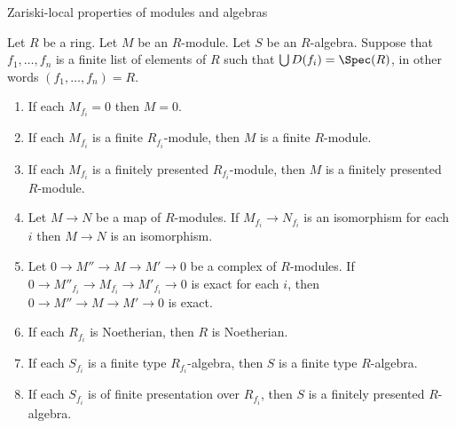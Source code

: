 \begin{lemma}
\label{lemma-cover}
\begin{slogan}
Zariski-local properties of modules and algebras
\end{slogan}
Let $R$ be a ring. Let $M$ be an $R$-module. Let $S$ be an $R$-algebra.
Suppose that $f_1, \ldots, f_n$ is a finite list of
elements of $R$ such that $\bigcup D(f_i) = \Spec(R)$,
in other words $(f_1, \ldots, f_n) = R$.
\begin{enumerate}
\item If each $M_{f_i} = 0$ then $M = 0$.
\item If each $M_{f_i}$ is a finite $R_{f_i}$-module,
then $M$ is a finite $R$-module.
\item If each $M_{f_i}$ is a finitely presented $R_{f_i}$-module,
then $M$ is a finitely presented $R$-module.
\item Let $M \to N$ be a map of $R$-modules. If $M_{f_i} \to N_{f_i}$
is an isomorphism for each $i$ then $M \to N$ is an isomorphism.
\item Let $0 \to M'' \to M \to M' \to 0$ be a complex of $R$-modules.
If $0 \to M''_{f_i} \to M_{f_i} \to M'_{f_i} \to 0$ is exact for each $i$,
then $0 \to M'' \to M \to M' \to 0$ is exact.
\item If each $R_{f_i}$ is Noetherian, then $R$ is Noetherian.
\item If each $S_{f_i}$ is a finite type $R_{f_i}$-algebra, then
$S$ is a finite type $R$-algebra.
\item If each $S_{f_i}$ is of finite presentation over $R_{f_i}$, then
$S$ is a finitely presented $R$-algebra.
\end{enumerate}
\end{lemma}

